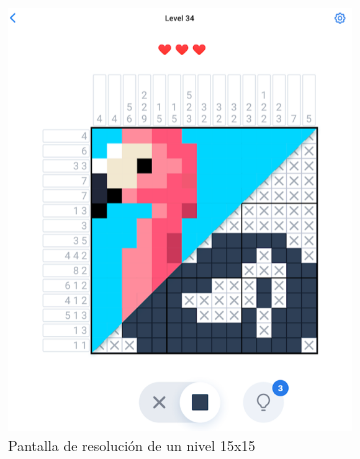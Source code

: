 \documentclass[11pt,spanish,listoffigures,listoftables]{tfgetsinf}
\begin{document}
\begin{figure}[h!]
   \centering
   \begin{subfigure}[b]{0.45\linewidth}
     \includegraphics[width=\linewidth]{images/picturecross1.png}
     \caption{Pantalla de resolución de un nivel 15x15}
     \label{fig:picture1-1}
   \end{subfigure}
   \begin{subfigure}[b]{0.45\linewidth}

\end{subfigure}
\end{figure}
\end{document}
